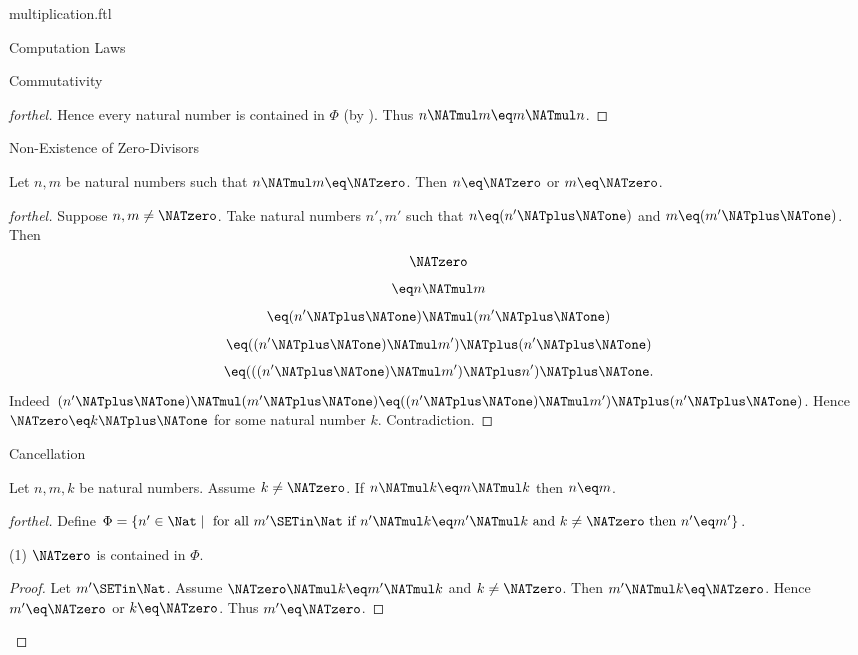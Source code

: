 \documentclass{naproche-library}
\begin{document}
\begin{smodule}[title=Multiplication]{multiplication.ftl}
\begin{sfragment}{Computation Laws}
\begin{sfragment}{Commutativity}
\begin{proof}[forthel]
      Hence every natural number is contained in $\Phi$ (by ).
      Thus $n \NATmul m \eq m \NATmul n$.
    \end{proof}
  \end{sfragment}

  \begin{sfragment}{Non-Existence of Zero-Divisors}
    \begin{proposition}[forthel,id=ARITHMETIC_06_3843962875936768]
      Let $n, m$ be natural numbers such that $n \NATmul m \eq \NATzero$.
      Then $n \eq \NATzero$ or $m \eq \NATzero$.
    \end{proposition}
    \begin{proof}[forthel]
      Suppose $n, m \neq \NATzero$.
      Take natural numbers $n', m'$ such that $n \eq (n' \NATplus \NATone)$ and $m \eq (m' \NATplus \NATone)$.
      Then
      \[  \NATzero                                     \]
      \[    \eq n \NATmul m                         \]
      \[    \eq (n' \NATplus \NATone) \NATmul (m' \NATplus \NATone)           \]
      \[    \eq ((n' \NATplus \NATone) \NATmul m') \NATplus (n' \NATplus \NATone)    \]
      \[    \eq (((n' \NATplus \NATone) \NATmul m') \NATplus n') \NATplus \NATone.   \]
      Indeed $(n' \NATplus \NATone) \NATmul (m' \NATplus \NATone) \eq ((n' \NATplus \NATone) \NATmul m') \NATplus (n' \NATplus \NATone)$.
      Hence $\NATzero \eq k \NATplus \NATone$ for some natural number $k$.
      Contradiction.
    \end{proof}
  \end{sfragment}

  \begin{sfragment}{Cancellation}
    \begin{proposition}[forthel,id=ARITHMETIC_06_31055184658432]
      Let $n, m, k$ be natural numbers.
      Assume $k \neq \NATzero$.
      If $n \NATmul k \eq m \NATmul k$ then $n \eq m$.
    \end{proposition}
    \begin{proof}[forthel]
      Define $\Phi = \{ n' \in \Nat \mid\text{ for all }m' \SETin \Nat\text{ if }n' \NATmul k \eq m' \NATmul k\text{ and }k \neq \NATzero\text{ then }n' \eq m' \}$.

      (1) $\NATzero$ is contained in $\Phi$.
      \begin{proof}
        Let $m' \SETin \Nat$.
        Assume $\NATzero \NATmul k \eq m' \NATmul k$ and $k \neq \NATzero$.
        Then $m' \NATmul k \eq \NATzero$.
        Hence $m' \eq \NATzero$ or $k \eq \NATzero$.
        Thus $m' \eq \NATzero$.
      \end{proof}


\end{proof}
\end{sfragment}
\end{sfragment}
\end{smodule}
\end{document}

